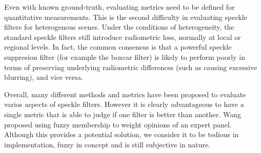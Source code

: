 \documentclass[journal]{IEEEtran}
\begin{document}
%

Even with known ground-truth, evaluating metrics need to be defined for quantitative measurements.
This is the second difficulty in evaluating speckle filters for heterogenous scenes.
Under the conditions of heterogeneity, the standard speckle filters still introduce radiometric loss, 
	normally at local or regional levels.
In fact, the common consensus is that a powerful speckle suppresion filter (for example the boxcar filter) 
	is likely to perform poorly in terms of preserving underlying radiometric differences 
	(such as causing excessive blurring), and vice versa. 

Overall, many different methods and metrics have been proposed to evaluate varios aspects of speckle filters. 
However it is clearly advantageous to have a single metric that is able to judge if one filter is better than another. 
Wang \cite{Wang_2005_MIPR} proposed using fuzzy membership to weight opinions of an expert panel. 
Although this provides a potential solution, we consider it to be tedious in implementation, fuzzy in concept and 
	is still subjective in nature.
\end{document}

